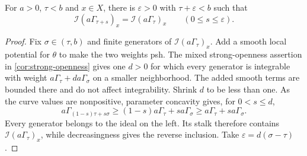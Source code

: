 \begin{lemma}\label{lem:test-curve-multiplier-parameter-openness}
For $a>0$, $\tau<b$ and $x\in X$, there is $\varepsilon>0$ with $\tau+\varepsilon<b$ such that
\[
 \mathcal I(a\Gamma_{\tau+s})_x=\mathcal I(a\Gamma_\tau)_x
                                     \qquad(0\leq s\leq\varepsilon).
\]
\end{lemma}
\begin{proof}
Fix $\sigma\in(\tau,b)$ and finite generators of $\mathcal I(a\Gamma_\tau)_x$. Add a smooth local potential for $\theta$ to make the two weights psh. The mixed strong-openness assertion in \cref{cor:strong-openness} gives one $d>0$ for which every generator is integrable with weight $a\Gamma_\tau+da\Gamma_\sigma$ on a smaller neighborhood. The added smooth terms are bounded there and do not affect integrability. Shrink $d$ to be less than one. As the curve values are nonpositive, parameter concavity gives, for $0<s\leq d$,
\[
 a\Gamma_{(1-s)\tau+s\sigma}
    \geq(1-s)a\Gamma_\tau+sa\Gamma_\sigma
    \geq a\Gamma_\tau+sa\Gamma_\sigma.
\]
Every generator belongs to the ideal on the left. Its stalk therefore contains $\mathcal I(a\Gamma_\tau)_x$, while decreasingness gives the reverse inclusion. Take $\varepsilon=d(\sigma-\tau)$.
\end{proof}

